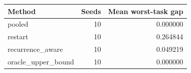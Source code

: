 \begin{tabular}{lrr}
\toprule
Method & Seeds & Mean worst-task gap \\
\midrule
pooled & 10 & 0.000000 \\
restart & 10 & 0.264844 \\
recurrence\_aware & 10 & 0.049219 \\
oracle\_upper\_bound & 10 & 0.000000 \\
\bottomrule
\end{tabular}
